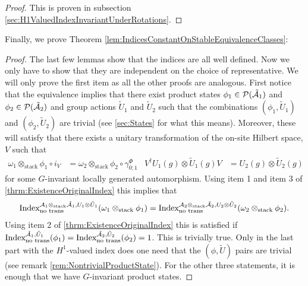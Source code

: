 \documentclass[11pt,a4paper,twoside]{article}
\numberwithin{equation}{section}
\begin{document}
	\begin{proof}
		This is proven in subsection \ref{sec:H1ValuedIndexInvariantUnderRotations}.
	\end{proof}
	Finally, we prove Theorem \ref{lem:IndicesConstantOnStableEquivalenceClasses}:
	\begin{proof}
		The last few lemmas show that the indices are all well defined. Now we only have to show that they are independent on the choice of representative.	We will only prove the first item as all the other proofs are analogous. First notice that the equivalence implies that there exist product states $\phi_1\in\PP(\tilde\AA_1)$ and $\phi_2\in\PP(\tilde\AA_2)$ and group actions $\tilde U_1$ and $\tilde U_2$ such that the combinations $(\phi_1,\tilde U_1)$ and $(\phi_2,\tilde U_2)$ are trivial (see \ref{sec:States} for what this means). Moreover, these will satisfy that there exists a unitary transformation of the on-site Hilbert space, $V$ such that
		\begin{align}
			\omega_1\otimes_{\text{stack}}\phi_1\circ i_V&=\omega_2\otimes_{\text{stack}}\phi_2\circ\gamma^\Phi_{0;1}&V^\dagger U_{1}(g)\otimes \tilde{U}_{1}(g)V&=U_{2}(g)\otimes \tilde{U}_{2}(g)
		\end{align}
		for some $G$-invariant locally generated automorphism. Using item 1 and item 3 of \ref{thrm:ExistenceOriginalIndex} this implies that
		\begin{equation}
			\textrm{Index}^{\AA_1\otimes_{\text{stack}}\tilde \AA_1,U_1\otimes \tilde U_1}_{\text{no trans}}(\omega_1\otimes_{\text{stack}}\phi_1) =\textrm{Index}^{\AA_2\otimes_{\text{stack}}\tilde \AA_2,U_2\otimes\tilde U_2}_{\text{no trans}}(\omega_2\otimes_{\text{stack}}\phi_2).
		\end{equation}
		Using item 2 of \ref{thrm:ExistenceOriginalIndex} this is satisfied if $\textrm{Index}^{\tilde \AA_1,\tilde U_1}_{\text{no trans}}(\phi_1)=\textrm{Index}^{\tilde \AA_2,\tilde U_2}_{\text{no trans}}(\phi_2)=1$. This is trivially true. Only in the last part with the $H^1$-valued index does one need that the $(\phi,\tilde U)$ pairs are trivial (see remark \ref{rem:NontrivialProductState}). For the other three statements, it is enough that we have $G$-invariant product states.
	\end{proof}
	\appendix
\end{document}
